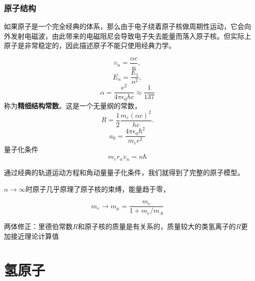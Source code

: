 \documentclass[UTF8, a4paper]{ctexart}
\begin{document}
\subsubsection{原子结构}

如果原子是一个完全经典的体系，那么由于电子绕着原子核做周期性运动，它会向外发射电磁波，由此带来的电磁阻尼会导致电子失去能量而落入原子核。但实际上原子是非常稳定的，因此描述原子不能只使用经典力学。

\[
    v_n = \frac{\alpha c}{n},
\]
\[
    E_n = \frac{E_1}{n^2},
\]
\begin{equation}
    \alpha = \frac{e^2}{4\pi \epsilon_0 h c} \approx \frac{1}{137}
\end{equation}
称为\textbf{精细结构常数}。这是一个无量纲的常数，
\[
    R = \frac{1}{2} \frac{m_e (\alpha c)^2}{hc}.
\]
\[
    a_0 = \frac{4\pi\epsilon_0 \hbar^2}{m_e e^2}
\]
量子化条件
\begin{equation}
    m_e r_n v_n = n \hbar
\end{equation}

通过经典的轨道运动方程和角动量量子化条件，我们就得到了完整的原子模型。

$n\to\infty$时原子几乎原理了原子核的束缚，能量趋于零，

\[
    m_e \longrightarrow m_\mu = \frac{m_e}{1 + m_e/m_A}
\]

两体修正：里德伯常数$R$和原子核的质量是有关系的，质量较大的类氢离子的$R$更加接近理论计算值

\section{氢原子}
\end{document}
